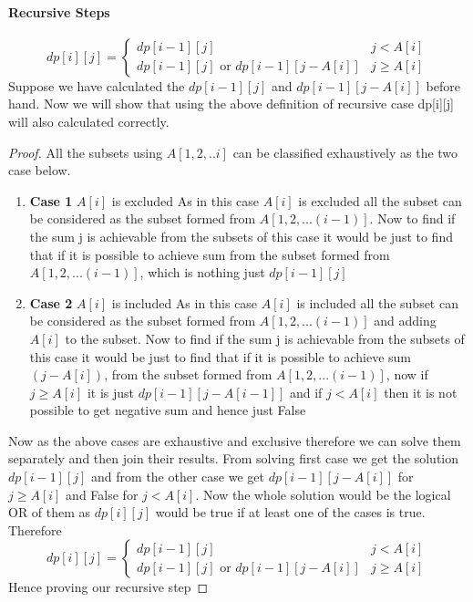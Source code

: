 \documentclass[answers]{exam}
\begin{document}
\begin{questions}
\begin{solution}
\paragraph{Recursive Steps} 
\[
    dp[i][j]=
    \begin{cases}
        dp[i-1][j] & j<A[i]\\
        dp[i-1][j] \text{ or } dp[i-1][j-A[i]] &j\geq A[i]
    \end{cases}
\]
Suppose we have calculated the $dp[i-1][j]$ and $dp[i-1][j-A[i]]$ before hand. Now we will show that using the above definition of recursive case dp[i][j] will also calculated correctly.
\begin{proof}
All the subsets using $A[1,2,..i]$ can be classified exhaustively as the two case below.
\begin{enumerate}
    \item \textbf{Case 1} $A[i]$ is excluded
    \newline As in this case $A[i]$ is excluded all the subset can be considered as the subset formed from $A[1,2,...(i-1)]$. Now to find if the sum j is achievable from the subsets of this case it would be just to find that if it is possible to achieve sum from the subset formed from $A[1,2,...(i-1)]$, which is nothing just $dp[i-1][j]$
    \item \textbf{Case 2} $A[i]$ is included
    \newline As in this case $A[i]$ is included all the subset can be considered as the subset formed from $A[1,2,...(i-1)]$ and adding $A[i]$ to the subset. Now to find if the sum j is achievable from the subsets of this case it would be just to find that if it is possible to achieve sum $(j-A[i])$,  from the subset formed from $A[1,2,...(i-1)]$, now if $j\geq A[i]$ it is just $dp[i-1][j-A[i-1]]$ and if $j<A[i]$ then it is not possible to get negative sum and hence just False
\end{enumerate}
Now as the above cases are exhaustive and exclusive therefore we can solve them separately and then join their results. From solving first case we get the solution $dp[i-1][j]$ and from the other case we get $dp[i-1][j-A[i]]$ for $j\geq A[i]$ and False for $j<A[i]$. Now the whole solution would be the logical OR of them as $dp[i][j]$ would be true if at least one of the cases is true. \newline Therefore 
\[
    dp[i][j]=
    \begin{cases}
        dp[i-1][j] & j<A[i]\\
        dp[i-1][j]\text{ or }dp[i-1][j-A[i]] &j\geq A[i]
    \end{cases}
\]
\newline Hence proving our recursive step
\end{proof}


\end{solution}
\end{questions}
\end{document}
